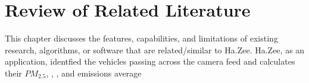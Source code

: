 \chapter{Review of Related Literature}
\label{sec:relatedlit}

This chapter discusses the features, capabilities, and limitations of existing research, algorithms, or software  that are related/similar to Ha.Zee. Ha.Zee, as an application, identfied the vehicles passing across the camera feed and calculates their $PM_{2.5}$, , , and  emissions average


\begin{comment}
%
%
Guide on Writing your RRL chapter
 
1. Identify the keywords with respect to your research
      One keyword = One document section
                Examples: 2.1 Story Generation Systems
			 2.2 Knowledge Representation

2.  Find references using these keywords

3.  For each of the references that you find,
        Check: Is it relevant to your research?
        Use their references to find more relevant works.

4. Identify a set of criteria for comparison.
       It will serve as a guide to help you focus on what to look for

5. Write a summary focusing on -
       What: A short description of the work
       How: A summary of the approach it utilized
       Findings: If applicable, provide the results
        Why: Relevance to your work

6. At the end of each section,  show a Table of Comparison of the related works 
   and your proposed project/system

\end{comment}

